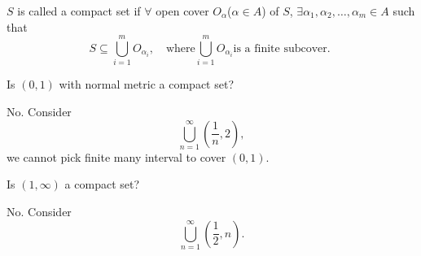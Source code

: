 \begin{definition}
    \(S\) is called a compact set if \(\forall \) open cover \(O_\alpha \)(\(\alpha \in A\)) of \(S\), \(\exists \alpha _1, \alpha _2, \dots , \alpha _m \in A\) such that
    \[
        S \subseteq \bigcup_{i=1}^{m} O_{\alpha _i}, \quad  \text{where} \bigcup_{i=1}^{m} O_{\alpha _i}\text{is a finite subcover. }
    \]
\end{definition}

\begin{eg}
    Is \((0,1)\) with normal metric a compact set? 
\end{eg}
\begin{explanation}
    No. Consider
    \[
        \bigcup_{n=1}^{\infty} \left( \frac{1}{n}, 2 \right),
    \] we cannot pick finite many interval to cover \((0,1)\). 
\end{explanation}

\begin{eg}
    Is \((1,\infty )\) a compact set? 
\end{eg}
\begin{explanation}
    No. Consider 
    \[
        \bigcup_{n=1}^{\infty} \left( \frac{1}{2}, n \right). 
    \]
\end{explanation}

